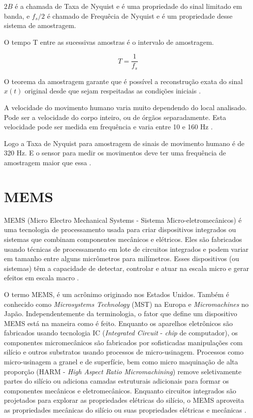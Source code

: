$2B$ é a chamada de Taxa de Nyquist e é uma propriedade do sinal limitado em banda, e $f_{s}/2$ é chamado de Frequêcia de Nyquist e é um propriedade desse sistema de amostragem.

O tempo T entre as sucessivas amostras é o intervalo de amostragem.

\begin{equation}
T=\frac{1}{f_{s}}
\end{equation}

O teorema da amostragem garante que é possível a reconstrução exata do sinal $ x(t) $ original desde que sejam respeitadas as condições iniciais \cite{willsky2010}.

A velocidade do movimento humano varia muito dependendo do local analisado. Pode ser a velocidade do corpo inteiro, ou de órgãos separadamente. Esta velocidade pode ser medida em frequência e varia entre 10 e 160 Hz \cite{song2016}.

Logo a Taxa de Nyquist para amostragem de sinais de movimento humano é de 320 Hz. E o sensor para medir os movimentos deve ter uma frequência de amostragem maior que essa \cite{song2016}. 


	\section{MEMS}

		MEMS (Micro Electro Mechanical Systems - Sistema Micro-eletromecânicos) é uma tecnologia de processamento usada para criar dispositivos integrados ou sistemas que combinam componentes mecânicos e elétricos. Eles são fabricados usando técnicas de processamento em lote de circuitos integrados e podem variar em tamanho entre alguns micrômetros para milímetros. Esses dispositivos (ou sistemas) têm a capacidade de detectar, controlar e atuar na escala micro e gerar efeitos em escala macro \cite{prime2002}. 

		O termo MEMS, é um acrônimo originado nos Estados Unidos. Também é conhecido como \textit{Microsystems Technology} (MST) na Europa e \textit{Micromachines} no Japão. Independentemente da terminologia, o fator que define um dispositivo MEMS está na maneira como é feito. Enquanto os aparelhos eletrônicos são fabricados usando tecnologia IC (\textit{Integrated Circuit} - \textit{chip} de computador), os componentes micromecânicos são fabricados por sofisticadas manipulações com silício e outros substratos usando processos de micro-usinagem. Processos como micro-usinagem a granel e de superfície, bem como micro maquinação de alta proporção (HARM - \textit{High Aspect Ratio Micromachining}) remove seletivamente partes do silício ou adiciona camadas estruturais adicionais para formar os componentes mecânicos e eletromecânicos. Enquanto circuitos integrados são projetados para explorar as propriedades elétricas do silício, o MEMS aproveita as propriedades mecânicas do silício ou suas propriedades elétricas e mecânicas \cite{prime2002}.

